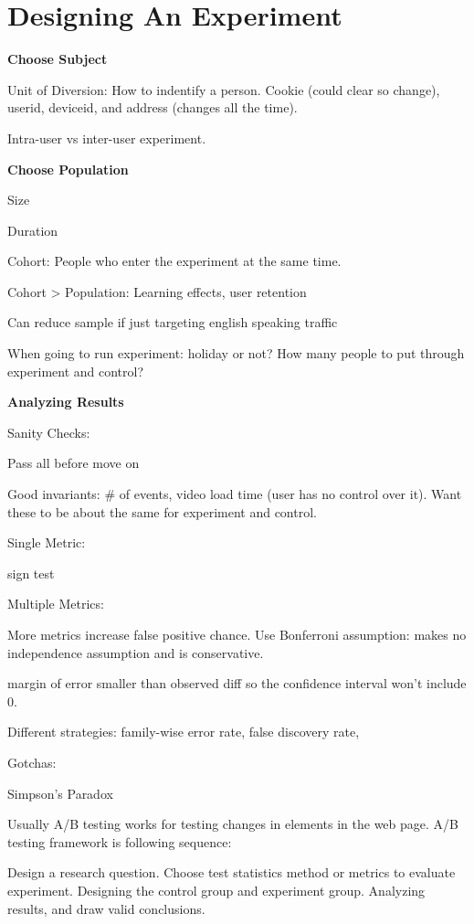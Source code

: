 \documentclass[]{book}
\theoremstyle{definition}
\theoremstyle{definition}
\theoremstyle{definition}
\theoremstyle{remark}
\begin{document}
\section{Designing An Experiment}\label{designing-an-experiment}

\textbf{Choose Subject}

Unit of Diversion: How to indentify a person. Cookie (could clear so
change), userid, deviceid, and address (changes all the time).

Intra-user vs inter-user experiment.

\textbf{Choose Population}

Size

Duration

Cohort: People who enter the experiment at the same time.

Cohort \textgreater{} Population: Learning effects, user retention

Can reduce sample if just targeting english speaking traffic

When going to run experiment: holiday or not? How many people to put
through experiment and control?

\textbf{Analyzing Results}

Sanity Checks:

Pass all before move on

Good invariants: \# of events, video load time (user has no control over
it). Want these to be about the same for experiment and control.

Single Metric:

sign test

Multiple Metrics:

More metrics increase false positive chance. Use Bonferroni assumption:
makes no independence assumption and is conservative.

margin of error smaller than observed diff so the confidence interval
won't include 0.

Different strategies: family-wise error rate, false discovery rate,

Gotchas:

Simpson's Paradox

Usually A/B testing works for testing changes in elements in the web
page. A/B testing framework is following sequence:

Design a research question. Choose test statistics method or metrics to
evaluate experiment. Designing the control group and experiment group.
Analyzing results, and draw valid conclusions.
\end{document}
